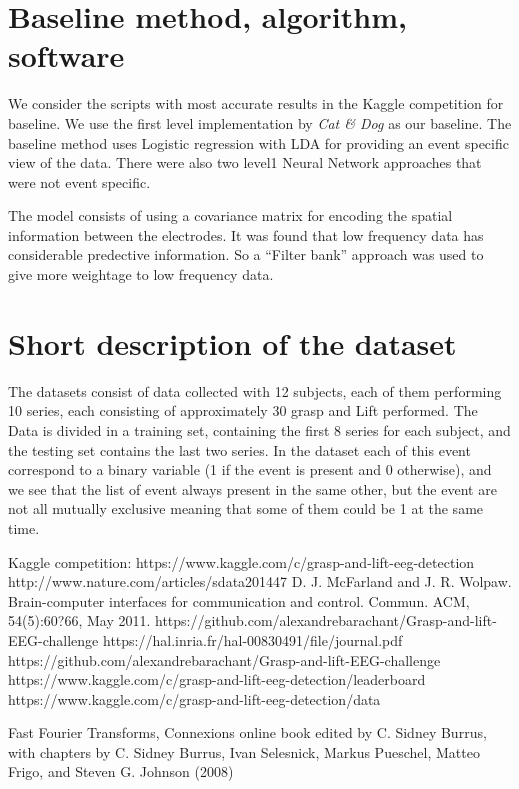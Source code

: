 \documentclass[final,leqno,onefignum,onetabnum]{siamltexmm}
\begin{document}
\section{Baseline method, algorithm, software}
We consider the scripts with most accurate results in the Kaggle competition for baseline\cite{kaggleleaderboard}.  We use the first level implementation by \textit{Cat \& Dog}\cite{kagglewinners} as our baseline.
The baseline method uses Logistic regression with LDA for providing an event specific view of the data.  There were also two level1 Neural Network approaches that were not event specific.

The model consists of using a covariance matrix for encoding the spatial information between the electrodes.  It was found that low frequency data has considerable predective information.  So a ``Filter bank'' approach was used to give more weightage to low frequency data.

\section{Short description of the dataset}
The  datasets consist of data collected with 12 subjects, each of them performing 10 series, each consisting of approximately 30 grasp and Lift performed. The Data is divided in a  training set, containing the first 8 series for each subject, and  the testing set contains the last two series.
In the dataset each of this event correspond to a binary variable (1 if the event is present and 0 otherwise), and we see that the list of event always present in the same other, but the event are not all mutually exclusive meaning that some of  them could be 1 at the same time.  

\begin{thebibliography}{1}
   Kaggle competition:  https://www.kaggle.com/c/grasp-and-lift-eeg-detection
   http://www.nature.com/articles/sdata201447
  D. J. McFarland and J. R. Wolpaw. Brain-computer interfaces for communication and control. Commun. ACM, 54(5):60?66, May 2011.
  https://github.com/alexandrebarachant/Grasp-and-lift-EEG-challenge
  https://hal.inria.fr/hal-00830491/file/journal.pdf
  https://github.com/alexandrebarachant/Grasp-and-lift-EEG-challenge
  https://www.kaggle.com/c/grasp-and-lift-eeg-detection/leaderboard
  https://www.kaggle.com/c/grasp-and-lift-eeg-detection/data
  
  Fast Fourier Transforms, Connexions online book edited by C. Sidney Burrus, with chapters by C. Sidney Burrus, Ivan Selesnick, Markus Pueschel, Matteo Frigo, and Steven G. Johnson (2008)
\end{thebibliography} 
\end{document}

